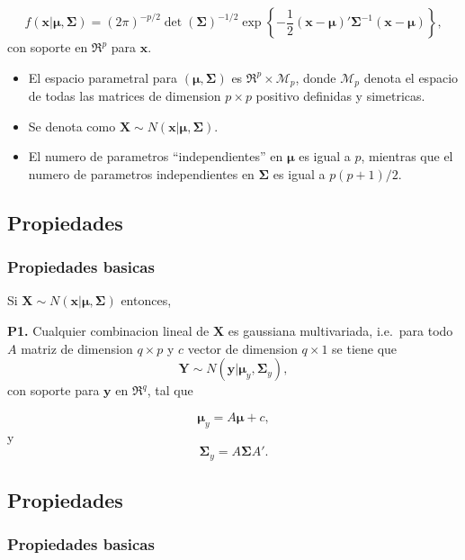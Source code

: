 \documentclass[11pt,]{article}
\begin{document}
\[
f(\boldsymbol{x}|\boldsymbol{\mu},\boldsymbol{\Sigma})
= 
(2\pi)^{-p/2} \det(\boldsymbol{\Sigma})^{-1/2} \exp\left\{-\frac{1}{2} (\boldsymbol{x}-\boldsymbol{\mu})'\boldsymbol{\Sigma}^{-1}(\boldsymbol{x}-\boldsymbol{\mu})\right\},
\] con soporte en \(\Re^{p}\) para \(\boldsymbol{x}\).

\begin{itemize}
\item
  El espacio parametral para \((\boldsymbol{\mu},\boldsymbol{\Sigma})\)
  es \(\Re^p \times \mathcal{M}_p\), donde \(\mathcal{M}_p\) denota el
  espacio de todas las matrices de dimension \(p \times p\) positivo
  definidas y simetricas.
\item
  Se denota como
  \(\boldsymbol{X} \sim N(\boldsymbol{x}|\boldsymbol{\mu},\boldsymbol{\Sigma})\).
\item
  El numero de parametros ``independientes'' en \(\boldsymbol{\mu}\) es
  igual a \(p\), mientras que el numero de parametros independientes en
  \(\boldsymbol{\Sigma}\) es igual a \(p(p+1)/2\).
\end{itemize}

\subsection{Propiedades}\label{propiedades}

\subsubsection{Propiedades basicas}\label{propiedades-basicas}

Si
\(\boldsymbol{X} \sim N(\boldsymbol{x}|\boldsymbol{\mu},\boldsymbol{\Sigma})\)
entonces,

\textbf{P1.} Cualquier combinacion lineal de \(\boldsymbol{X}\) es
gaussiana multivariada, i.e.~para todo \(A\) matriz de dimension
\(q\times p\) y \(c\) vector de dimension \(q \times 1\) se tiene que \[
\boldsymbol{Y}\sim N(\boldsymbol{y}|\boldsymbol{\mu}_y,\boldsymbol{\Sigma}_y),
\] con soporte para \(\boldsymbol{y}\) en \(\Re^{q}\), tal que

\[
\boldsymbol{\mu}_y = A\boldsymbol{\mu} + c,
\] y \[
\boldsymbol{\Sigma}_y = A\boldsymbol{\Sigma}A'.
\]

\subsection{Propiedades}\label{propiedades-1}

\subsubsection{Propiedades basicas}\label{propiedades-basicas-1}
\end{document}

